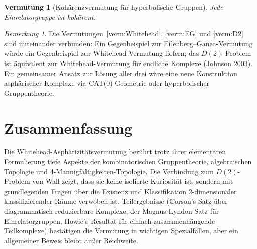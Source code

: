 \documentclass[12pt,a4paper]{amsart}
\newtheorem{vermutung}[theorem]{Vermutung}
\theoremstyle{definition}
\theoremstyle{remark}
\newtheorem{bemerkung}[theorem]{Bemerkung}
\begin{document}
\begin{vermutung}[Kohärenzvermutung für hyperbolische Gruppen]
Jede Einrelatorgruppe ist kohärent.
\end{vermutung}

\begin{bemerkung}
Die Vermutungen~\ref{verm:Whitehead}, \ref{verm:EG} und \ref{verm:D2} sind
miteinander verbunden: Ein Gegenbeispiel zur Eilenberg--Ganea-Vermutung würde
ein Gegenbeispiel zur Whitehead-Vermutung liefern; das $D(2)$-Problem ist
äquivalent zur Whitehead-Vermutung für endliche Komplexe (Johnson 2003).
Ein gemeinsamer Ansatz zur Lösung aller drei wäre eine neue Konstruktion
asphärischer Komplexe via CAT(0)-Geometrie oder hyperbolischer Gruppentheorie.
\end{bemerkung}

\section{Zusammenfassung}

Die Whitehead-Asphärizitätsvermutung berührt trotz ihrer elementaren
Formulierung tiefe Aspekte der kombinatorischen Gruppentheorie, algebraischen
Topologie und 4-Mannigfaltigkeiten-Topologie. Die Verbindung zum $D(2)$-Problem
von Wall zeigt, dass sie keine isolierte Kuriosität ist, sondern mit
grundlegenden Fragen über die Existenz und Klassifikation 2-dimensionaler
klassifizierender Räume verwoben ist. Teilergebnisse (Corson's Satz über
diagrammatisch reduzierbare Komplexe, der Magnus-Lyndon-Satz für
Einrelatorgruppen, Howie's Resultat für einfach zusammenhängende Teilkomplexe)
bestätigen die Vermutung in wichtigen Spezialfällen, aber ein allgemeiner
Beweis bleibt außer Reichweite.
\end{document}
